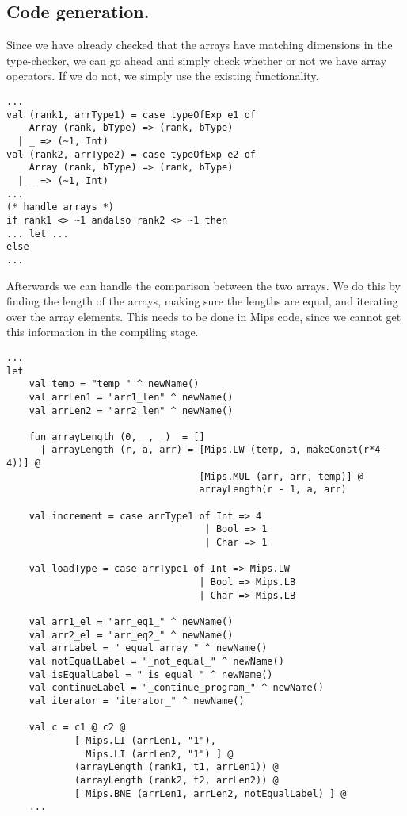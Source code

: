 \documentclass[12pt]{article}
\begin{document}
\pagebreak

\subsection{Code generation.}

Since we have already checked that the arrays have matching dimensions in the type-checker, we can go ahead and simply check whether or not we have array operators. If we do not, we simply use the existing functionality.

\begin{lstlisting}[caption=Compiler.sml check for arrays in equal operation.]
...
val (rank1, arrType1) = case typeOfExp e1 of
    Array (rank, bType) => (rank, bType)
  | _ => (~1, Int)
val (rank2, arrType2) = case typeOfExp e2 of 
    Array (rank, bType) => (rank, bType)
  | _ => (~1, Int)                              
...
(* handle arrays *)
if rank1 <> ~1 andalso rank2 <> ~1 then
... let ...
else
...
\end{lstlisting}

Afterwards we can handle the comparison between the two arrays. We do this by finding the length of the arrays, making sure the lengths are equal, and iterating over the array elements. This needs to be done in Mips code, since we cannot get this information in the compiling stage.

\begin{lstlisting}[caption=Compiler.sml calculate array lengths in equal operation.]
... 
let
    val temp = "temp_" ^ newName()                             
    val arrLen1 = "arr1_len" ^ newName()
    val arrLen2 = "arr2_len" ^ newName()

    fun arrayLength (0, _, _)  = []
      | arrayLength (r, a, arr) = [Mips.LW (temp, a, makeConst(r*4-4))] @
                                  [Mips.MUL (arr, arr, temp)] @
                                  arrayLength(r - 1, a, arr)

    val increment = case arrType1 of Int => 4
                                   | Bool => 1
                                   | Char => 1
                    
    val loadType = case arrType1 of Int => Mips.LW
                                  | Bool => Mips.LB
                                  | Char => Mips.LB

    val arr1_el = "arr_eq1_" ^ newName()
    val arr2_el = "arr_eq2_" ^ newName() 
    val arrLabel = "_equal_array_" ^ newName()
    val notEqualLabel = "_not_equal_" ^ newName()
    val isEqualLabel = "_is_equal_" ^ newName()
    val continueLabel = "_continue_program_" ^ newName()
    val iterator = "iterator_" ^ newName()

    val c = c1 @ c2 @ 
            [ Mips.LI (arrLen1, "1"), 
              Mips.LI (arrLen2, "1") ] @
            (arrayLength (rank1, t1, arrLen1)) @
            (arrayLength (rank2, t2, arrLen2)) @
            [ Mips.BNE (arrLen1, arrLen2, notEqualLabel) ] @
    ...
\end{lstlisting} 
\end{document}
